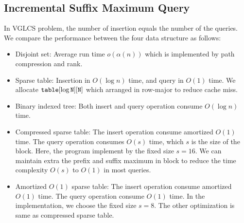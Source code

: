 
\subsection{Incremental Suffix Maximum Query}

In VGLCS problem, the number of insertion equals the number of the
queries. We compare the performance between the four data structure as
follows:

\iffalse
針對插入和詢問次數相同的 ISMQ 問題，運行以下四種數據結構：
\fi

\begin{itemize}
  \item 

Disjoint set: Average run time $o(\alpha(n))$ which is implemented by
path compression and rank.

  \item 

Sparse table: Insertion in $O(\log n)$ time, and query in $O(1)$ time.
We allocate $\tt{table}[\log N][N]$ which arranged in row-major to
reduce cache miss.

  \item 

Binary indexed tree: Both insert and query operation consume $O(\log
n)$ time.

  \item 

Compressed sparse table: The insert operation consume amortized
$O(1)$ time.  The query operation consumes $O(s)$ time, which $s$ is the
size of the block.  Here, the program implement by the fixed size $s =
16$.  We can maintain extra the prefix and suffix maximum in block to
reduce the time complexity $O(s)$ to $O(1)$ in most queries.

  \item

Amortized $O(1)$ sparse table:  The insert operation consume amortized
$O(1)$ time.  The query operation consume $O(1)$ time.  In the
implementation, we choose the fixed size $s = 8$.  The other
optimization is same as compressed sparse table.

\end{itemize}

\iffalse
\begin{itemize}
  \item 并查集 (Disjoint Set): 平均運行時間 $o(\alpha(n))$。只使用路徑壓縮技巧。
  \item 稀疏表 (Sparse Table): 插入 $O(\log n)$、詢問 $O(1)$。實作陣列宣告採用 $\tt{table}[\log N][N]$ 以減少快取未中。
  \item 樹狀數組 (Binary Indexed Tree): 插入、詢問均為 $O(\log n)$。
  \item 壓縮稀疏表 (Compressed Sparse Tree): 插入均攤 $O(1)$、詢問操作 $O(s)$，
  其中 $s$ 為拆分到區塊大小。實作時，維護區塊前綴和後綴最大值降低詢問複雜度至 $O(1)$，當發生 in-block 詢問再運行 $O(s)$ 算法。
\end{itemize}
\fi

